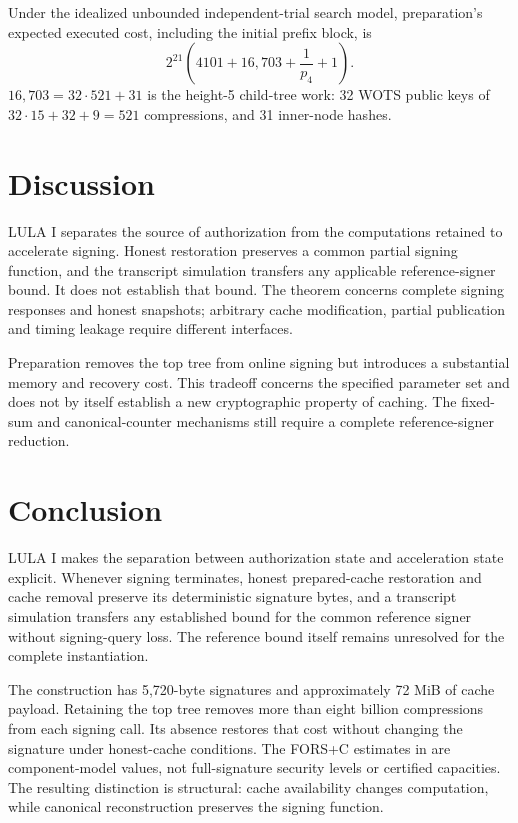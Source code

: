 \documentclass[a4paper,envcountsame,runningheads]{llncs}
\begin{document}
Under the idealized unbounded independent-trial search model, preparation's expected executed cost, including the initial prefix block, is
\[
 2^{21}\left(4101+16{,}703+\frac{1}{p_4}+1\right).
\]
$16{,}703=32\cdot521+31$ is the height-5 child-tree work: 32 WOTS public keys of $32\cdot15+32+9=521$ compressions, and 31 inner-node hashes.


\FloatBarrier

\section{Discussion}\label{sec:limits}
LULA I separates the source of authorization from the computations retained to accelerate signing. Honest restoration preserves a common partial signing function, and the transcript simulation transfers any applicable reference-signer bound. It does not establish that bound. The theorem concerns complete signing responses and honest snapshots; arbitrary cache modification, partial publication and timing leakage require different interfaces.

Preparation removes the top tree from online signing but introduces a substantial memory and recovery cost. This tradeoff concerns the specified parameter set and does not by itself establish a new cryptographic property of caching. The fixed-sum and canonical-counter mechanisms still require a complete reference-signer reduction.

\section{Conclusion}\label{sec:conclusion}
LULA I makes the separation between authorization state and acceleration state explicit. Whenever signing terminates, honest prepared-cache restoration and cache removal preserve its deterministic signature bytes, and a transcript simulation transfers any established bound for the common reference signer without signing-query loss. The reference bound itself remains unresolved for the complete instantiation.

The construction has 5,720-byte signatures and approximately 72 MiB of cache payload. Retaining the top tree removes more than eight billion compressions from each signing call. Its absence restores that cost without changing the signature under honest-cache conditions. The FORS+C estimates in  are component-model values, not full-signature security levels or certified capacities. The resulting distinction is structural: cache availability changes computation, while canonical reconstruction preserves the signing function.
\end{document}
